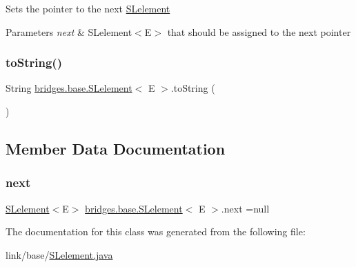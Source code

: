 Sets the pointer to the next \hyperlink{classbridges_1_1base_1_1_s_lelement}{S\+Lelement} 
\begin{DoxyParams}{Parameters}
{\em next} & S\+Lelement$<$\+E$>$ that should be assigned to the next pointer \\
\hline
\end{DoxyParams}
\hypertarget{classbridges_1_1base_1_1_s_lelement_af0ec4da5b29d0f5ab6ab38e91cca51f9}{}\label{classbridges_1_1base_1_1_s_lelement_af0ec4da5b29d0f5ab6ab38e91cca51f9} 
\subsubsection{\texorpdfstring{to\+String()}{toString()}}
{\footnotesize\ttfamily String \hyperlink{classbridges_1_1base_1_1_s_lelement}{bridges.\+base.\+S\+Lelement}$<$ E $>$.to\+String (\begin{DoxyParamCaption}{ }\end{DoxyParamCaption})}



\subsection{Member Data Documentation}
\hypertarget{classbridges_1_1base_1_1_s_lelement_abf61c96a74ad319d561c6952ea388e0e}{}\label{classbridges_1_1base_1_1_s_lelement_abf61c96a74ad319d561c6952ea388e0e} 
\subsubsection{\texorpdfstring{next}{next}}
{\footnotesize\ttfamily \hyperlink{classbridges_1_1base_1_1_s_lelement}{S\+Lelement}$<$E$>$ \hyperlink{classbridges_1_1base_1_1_s_lelement}{bridges.\+base.\+S\+Lelement}$<$ E $>$.next =null\hspace{0.3cm}{\ttfamily [protected]}}



The documentation for this class was generated from the following file\+:\begin{DoxyCompactItemize}
\item 
link/base/\hyperlink{_s_lelement_8java}{S\+Lelement.\+java}\end{DoxyCompactItemize}
